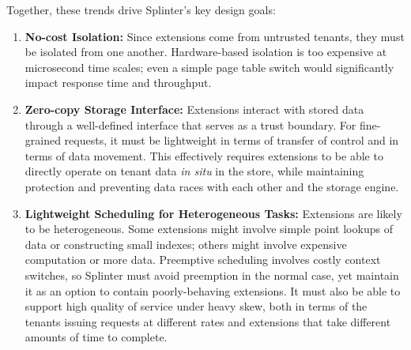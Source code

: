 Together, these trends drive Splinter's key design goals:
\begin{enumerate}
\item {\bf No-cost Isolation:}
  Since extensions come from untrusted tenants, they must be isolated from one
    another.
  Hardware-based isolation is too
    expensive at microsecond time scales; even a simple page table switch would
    significantly impact response time and throughput.

\item {\bf Zero-copy Storage Interface:}
  Extensions interact with stored data through a well-defined interface that
    serves as a trust boundary.
  For fine-grained requests, it
    must be lightweight in terms of transfer of control and in terms of
    data movement.
  This effectively requires extensions to be able to directly operate on tenant
    data \textit{in situ} in the store, while maintaining protection and
    preventing data races with each other and the storage engine.

\item {\bf Lightweight Scheduling for Heterogeneous Tasks:}
  Extensions are likely to be heterogeneous.
  Some extensions might involve simple point lookups of data or constructing
    small indexes; others might involve expensive computation or more data.
  Preemptive scheduling involves costly context switches, so Splinter
    must avoid preemption in the normal case, yet maintain it as an option
    to contain poorly-behaving extensions.
  It must also be able to support high quality of service under heavy skew, 
    both in terms of the tenants issuing requests at different rates and
    extensions that take different amounts of time to complete.


\end{enumerate}

